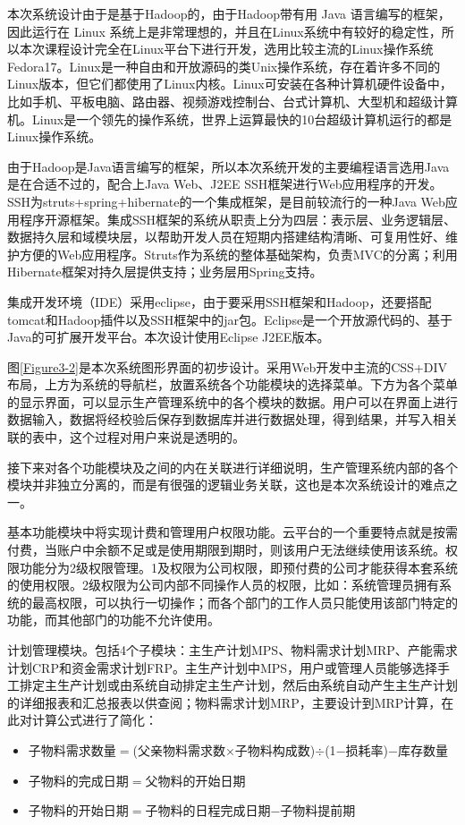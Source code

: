 \documentclass{Proposal}
\begin{document}

本次系统设计由于是基于Hadoop的，由于Hadoop带有用 Java 语言编写的框架，因此运行在 Linux 系统上是非常理想的，并且在Linux系统中有较好的稳定性，所以本次课程设计完全在Linux平台下进行开发，选用比较主流的Linux操作系统Fedora17。Linux是一种自由和开放源码的类Unix操作系统，存在着许多不同的Linux版本，但它们都使用了Linux内核。Linux可安装在各种计算机硬件设备中，比如手机、平板电脑、路由器、视频游戏控制台、台式计算机、大型机和超级计算机。Linux是一个领先的操作系统，世界上运算最快的10台超级计算机运行的都是Linux操作系统。

由于Hadoop是Java语言编写的框架，所以本次系统开发的主要编程语言选用Java是在合适不过的，配合上Java Web、J2EE SSH框架进行Web应用程序的开发。SSH为struts+spring+hibernate的一个集成框架，是目前较流行的一种Java Web应用程序开源框架。集成SSH框架的系统从职责上分为四层：表示层、业务逻辑层、数据持久层和域模块层，以帮助开发人员在短期内搭建结构清晰、可复用性好、维护方便的Web应用程序。Struts作为系统的整体基础架构，负责MVC的分离；利用Hibernate框架对持久层提供支持；业务层用Spring支持。

集成开发环境（IDE）采用eclipse，由于要采用SSH框架和Hadoop，还要搭配tomcat和Hadoop插件以及SSH框架中的jar包。Eclipse是一个开放源代码的、基于Java的可扩展开发平台。本次设计使用Eclipse J2EE版本。

图\ref{Figure3-2}是本次系统图形界面的初步设计。采用Web开发中主流的CSS+DIV布局，上方为系统的导航栏，放置系统各个功能模块的选择菜单。下方为各个菜单的显示界面，可以显示生产管理系统中的各个模块的数据。用户可以在界面上进行数据输入，数据将经校验后保存到数据库并进行数据处理，得到结果，并写入相关联的表中，这个过程对用户来说是透明的。


接下来对各个功能模块及之间的内在关联进行详细说明，生产管理系统内部的各个模块并非独立分离的，而是有很强的逻辑业务关联，这也是本次系统设计的难点之一。

基本功能模块中将实现计费和管理用户权限功能。云平台的一个重要特点就是按需付费，当账户中余额不足或是使用期限到期时，则该用户无法继续使用该系统。权限功能分为2级权限管理。1及权限为公司权限，即预付费的公司才能获得本套系统的使用权限。2级权限为公司内部不同操作人员的权限，比如：系统管理员拥有系统的最高权限，可以执行一切操作；而各个部门的工作人员只能使用该部门特定的功能，而其他部门的功能不允许使用。

计划管理模块。包括4个子模块：主生产计划MPS、物料需求计划MRP、产能需求计划CRP和资金需求计划FRP。主生产计划中MPS，用户或管理人员能够选择手工排定主生产计划或由系统自动排定主生产计划，然后由系统自动产生主生产计划的详细报表和汇总报表以供查阅；物料需求计划MRP，主要设计到MRP计算，在此对计算公式进行了简化：
\begin{itemize}
\item 子物料需求数量$=$(父亲物料需求数$\times$子物料构成数)$\div$(1$-$损耗率)$-$库存数量
\item 子物料的完成日期$=$父物料的开始日期
\item 子物料的开始日期$=$子物料的日程完成日期$-$子物料提前期
\end{itemize}
\end{document}
